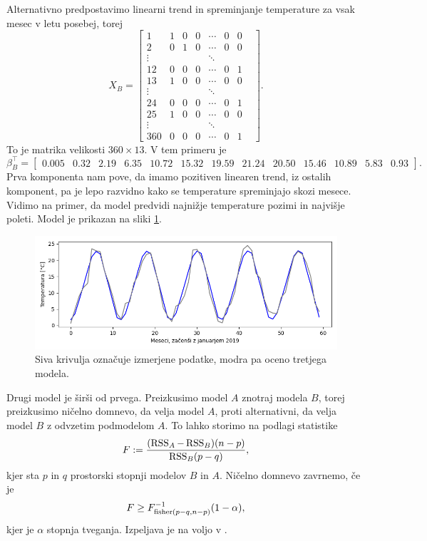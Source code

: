 \documentclass[12pt, a4paper]{article}
\begin{document}
Alternativno predpostavimo linearni trend in spreminjanje temperature za vsak mesec
v letu posebej, torej
\[
    X_B = \begin{bmatrix}
        1 & 1 & 0 & 0 & \cdots & 0 & 0 \\
        2 & 0 & 1 & 0 & \cdots & 0 & 0 \\
        \vdots & & & & \ddots & & & \\
        12 & 0 & 0 & 0 & \cdots & 0 & 1 \\
        13 & 1 & 0 & 0 & \cdots & 0 & 0 \\
        \vdots & & & & \ddots & & & \\
        24 & 0 & 0 & 0 & \cdots & 0 & 1 \\
        25 & 1 & 0 & 0 & \cdots & 0 & 0 \\
        \vdots & & & & \ddots & & & \\
        360 & 0 & 0 & 0 & \cdots & 0 & 1 
    \end{bmatrix}.
\]
To je matrika velikosti $360 \times 13$. V tem primeru je
\footnotesize
\setcounter{MaxMatrixCols}{20}
\[
    \beta_B^\top = \begin{bmatrix}
        0.005 & 0.32 & 2.19 & 6.35 & 10.72 & 15.32 & 
        19.59 & 21.24 & 20.50 & 15.46 & 10.89 & 5.83 & 0.93
    \end{bmatrix}.
\]
\normalsize
Prva komponenta nam pove, da imamo pozitiven linearen trend, 
iz ostalih komponent, pa je lepo razvidno kako se temperature
spreminjajo skozi mesece. Vidimo na primer, da model 
predvidi najnižje temperature pozimi in najvišje poleti.
Model je prikazan na sliki \ref{png:drugi}.
\begin{figure}[H]
    \centering
    \includegraphics[width=14cm]{Slike/drugi_model.png}
    \caption{Siva krivulja označuje izmerjene podatke, modra pa oceno 
    tretjega modela.}
    \label{png:drugi}
\end{figure}
Drugi model je širši od prvega. Preizkusimo model $A$ znotraj 
modela $B$, torej preizkusimo ničelno domnevo, da velja model $A$, 
proti alternativni, da velja model $B$ z odvzetim podmodelom $A$.
To lahko storimo na podlagi statistike
\[
    F := \frac{(\operatorname{RSS}_A - \operatorname{RSS}_B)(n-p)}{\operatorname{RSS}_B (p-q)},
\]
kjer sta $p$ in $q$ prostorski stopnji modelov $B$ in $A$. 
Ničelno domnevo zavrnemo, če je 
\[
    F \ge F^{-1}_{\operatorname{fisher}(p-q,n-p)}(1-\alpha),
\]
kjer je $\alpha$ stopnja tveganja. 
Izpeljava je na voljo v \cite{raic2}. 
\end{document}
